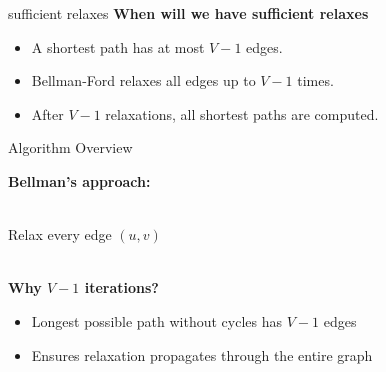\documentclass{beamer}
\begin{document}
    \begin{frame} {sufficient relaxes}
        \textbf{When will we have sufficient relaxes} \\
        \begin{itemize}
            \item A shortest path has at most \( V - 1 \) edges.
            \item Bellman-Ford relaxes all edges up to \( V - 1 \) times.
            \item After \( V - 1 \) relaxations, all shortest paths are computed.
        \end{itemize}

    \end{frame}
    

    \begin{frame}{Algorithm Overview}

    
        \textbf{Bellman's approach:}\\
       \begin{algorithm}
            \vspace{3mm}
            \begin{algorithmic}
                \hspace{1cm} 
                    \\
                       \hspace{1.5cm} \State Relax every edge $(u, v)$
                    \EndFor
                \EndFor
        \end{algorithmic}
    \end{algorithm}\\
    
        \vspace{1cm}
        \textbf{Why $V-1$ iterations?}
        \begin{itemize}
            \item Longest possible path without cycles has $V-1$ edges
            \item Ensures relaxation propagates through the entire graph
        \end{itemize}
    \end{frame}
    
\end{document}
